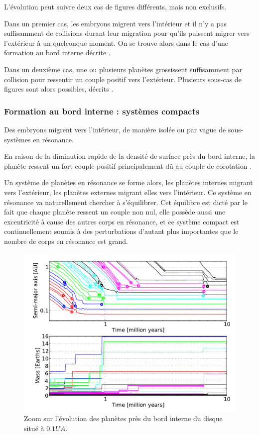 L'évolution peut suivre deux cas de figures différents, mais non exclusifs.

Dans un premier cas, les embryons migrent vers l'intérieur et il n'y a pas suffisamment de collisions durant leur migration pour qu'ils puissent migrer vers l'extérieur à un quelconque moment. On se trouve alors dans le cas d'une formation au bord interne décrite . 

Dans un deuxième cas, une ou plusieurs planètes grossissent suffisamment par collision pour ressentir un couple positif vers l'extérieur. Plusieurs sous-cas de figures sont alors possibles, décrits .

\subsubsection{Formation au bord interne : systèmes compacts}\label{sec:inner_edge_formation}
Des embryons migrent vers l'intérieur, de manière isolée ou par vague de sous-systèmes en résonance.

En raison de la diminution rapide de la densité de surface près du bord interne, la planète ressent un fort couple positif principalement dû au couple de corotation . 

Un système de planètes en résonance se forme alors, les planètes internes migrant vers l'extérieur, les planètes externes migrant elles vers l'intérieur. Ce système en résonance va naturellement chercher à s'équilibrer. Cet équilibre est dicté par le fait que chaque planète ressent un couple non nul, elle possède aussi une excentricité à cause des autres corps en résonance, et ce système compact est continuellement soumis à des perturbations d'autant plus importantes que le nombre de corps en résonance est grand. 

\begin{figure}[htbp]
\centering
\includegraphics[width=0.7\linewidth]{figure/HSE/inner_system.pdf}
\caption{Zoom sur l'évolution des planètes près du bord interne du disque situé à $0.1\unit{UA}$. }\label{fig:HSE_inner_system}
\end{figure}%

